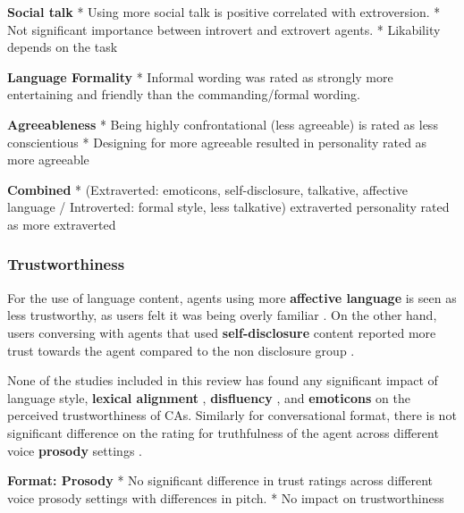 \documentclass[sigconf,screen,review, anonymous]{acmart}
\newcommand{\cmt}[1]{}%
\begin{document}
\textbf{Social talk}
* Using more social talk is positive correlated with extroversion. \cite{volkel2021manipulating}\cmt{[68]}
* Not significant importance between introvert and extrovert agents. \cite{roy2021users}\cmt{[71]}
* Likability depends on the task \cite{haas2022keep}\cmt{[78]}

\textbf{Language Formality}
* Informal wording was rated as strongly more entertaining and friendly than the commanding/formal wording. \cite{jestin2022effects}\cmt{[81]}

\textbf{Agreeableness}
* Being highly confrontational (less agreeable) is rated as less conscientious \cite{volkel2021manipulating}\cmt{[68]}
* Designing for more agreeable resulted in personality rated as more agreeable \cite{volkel2021examining}\cmt{[69]}

\textbf{Combined}
* (Extraverted: emoticons, self-disclosure, talkative, affective language / Introverted: formal style, less talkative) extraverted personality rated as more extraverted \cite{volkel2022user}\cmt{[75]}

\subsubsection{Trustworthiness}

For the use of language content, agents using more \textbf{affective language} is seen as less trustworthy, as users felt it was being overly familiar \cite{andrews2012system}\cmt{[38]}. On the other hand, users conversing with agents that used \textbf{self-disclosure} content reported more trust towards the agent compared to the non disclosure group \cite{lee2020hear}\cmt{[23]}.

None of the studies included in this review has found any significant impact of language style, \textbf{lexical alignment} \cite{hoegen2019end}\cmt{[31]}\cite{huiyang2022improving}\cmt{[17]}\cite{linnemann2018can}\cmt{[15]}, \textbf{disfluency} \cite{pfeifer2009should}\cmt{[12]}, and \textbf{emoticons} \cite{wilhelm2022keep}\cmt{[28]} on the perceived trustworthiness of CAs. Similarly for conversational format, there is not significant difference on the rating for truthfulness of the agent across different voice \textbf{prosody} settings \cite{dubiel2020persuasive}\cmt{[60]}.

\textbf{Format: Prosody}
* No significant difference in trust ratings across different voice prosody settings with differences in pitch. \cite{tolmeijer2021female}\cmt{[62]}
* No impact on trustworthiness  \cite{jestin2022effects}\cmt{[81]}
\end{document}

